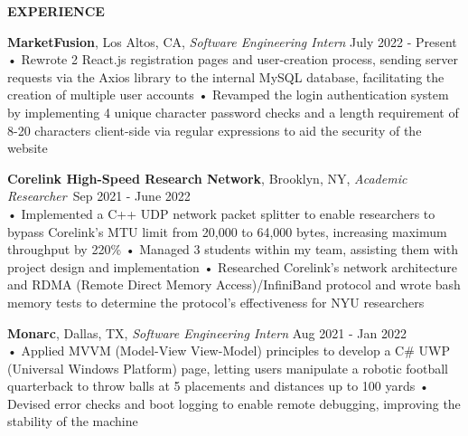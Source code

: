 \documentclass{resume} %
\begin{document}
\begin{rSection}{\textbf{EXPERIENCE}}

\textbf{MarketFusion}, Los Altos, CA, {\emph{Software Engineering Intern}} \hfill July 2022 - Present\\
• Rewrote 2 React.js registration pages and user-creation process, sending server requests via the Axios library to the internal MySQL database, facilitating the creation of multiple user accounts \newline
• Revamped the login authentication system by implementing 4 unique character password checks and a length requirement of 8-20 characters client-side via regular expressions to aid the security of the website 

\textbf{Corelink High-Speed Research Network}, Brooklyn, NY, {\emph{Academic Researcher}}\ \hfill Sep 2021 - June 2022 \\
• Implemented a C++ UDP network packet splitter to enable researchers to bypass Corelink's MTU limit from 20,000 to 64,000 bytes, increasing maximum throughput by 220\% \newline
• Managed 3 students within my team, assisting them with project design and implementation \newline
• Researched Corelink’s network architecture and RDMA (Remote Direct Memory Access)/InfiniBand protocol and wrote bash memory tests to determine the protocol's effectiveness for NYU researchers

\textbf{Monarc}, Dallas, TX, {\emph{Software Engineering Intern}} \hfill Aug 2021 - Jan 2022\\
• Applied MVVM (Model-View View-Model) principles to develop a C\# UWP (Universal Windows Platform) page, letting users manipulate a robotic football quarterback to throw balls at 5 placements and distances up to 100 yards \newline  %
• Devised error checks and boot logging to enable remote debugging, improving the stability of the machine \smallskip
\end{rSection} 
\end{document}
